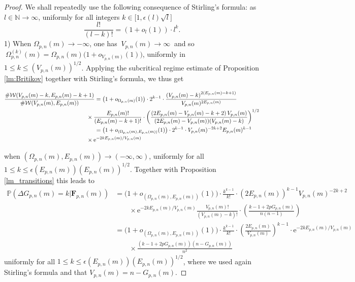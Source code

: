 \documentclass[a4, 11pt]{article}
\numberwithin{equation}{section}
\theoremstyle{plain}
\theoremstyle{definition}
\theoremstyle{remark}
\begin{document}
\begin{proof} We shall repeatedly use the following consequence of Stirling's formula: as $l \in \mathbb N \rightarrow \infty$, uniformly for all integers $k \in \big[ 1,\epsilon(l) \sqrt l \big]$ 
$$
\frac{l!}{(l-k)!}=(1+o_l(1)) \cdot l^k.
$$	
1) When $\Omega_{p,n}(m)\to -\infty$, one has $~V_{p,n}(m)\to \infty~$ and so $~\Omega_{p,n}^{(k)}(m)= \Omega_{p,n}(m)\big(1+o_{V_{p,n}(m)}(1)\big)$, uniformly in $1\leq k\leq \left(V_{p,n}(m)\right)^{1/2}$. Applying the subcritical regime estimate of Proposition \ref{lm:Britikov} together with Stirling's formula, we thus get
\begin{spreadlines}{5pt}
\begin{align*}
	\frac{\#\mathcal{W}(V_{p,n}(m)-k,E_{p,n}(m)-k+1)}{\#\mathcal{W}(V_{p,n}(m),E_{p,n}(m))}&=\big(1+o_{\Omega_{p,n}(m)}(1)\big)\cdot 2^{k-1} \cdot \frac{\left(V_{p,n}(m)-k\right)^{2(E_{p,n}(m)-k+1)}}{V_{p,n}(m)^{2E_{p,n}(m)}}\\
         & \hspace{-0.5cm} \times  \frac{E_{p,n}(m)!}{\left(E_{p,n}(m)-k+1\right)!} \cdot \left(\frac{\left(2E_{p,n}(m)-V_{p,n}(m)-k+2\right)V_{p,n}(m)}{(2E_{p,n}(m)-V_{p,n}(m))(V_{p,n}(m)-k)}\right)^{1/2} \\
	&=\big(1+o_{(\Omega_{p,n}(m),E_{p,n}(m))}(1)\big) \cdot 2^{k-1} \cdot V_{p,n}(m)^{-2k+2} E_{p,n}(m)^{k-1} \\
	& \hspace{-0.5cm} \times \mathrm{e}^{-2kE_{p,n}(m)/V_{p,n}(m)}   
\end{align*}
\end{spreadlines}
when $(\Omega_{p,n}(m),E_{p,n}(m))\to (-\infty,\infty)$, uniformly for all $1\leq k\leq \epsilon(E_{p,n}(m))\left(E_{p,n}(m)\right)^{1/2}$. Together with Proposition \ref{lm_transitions} this leads to 
\begin{align*}
 \mathbb{P}\left( \Delta G_{p,n}(m)=k | \mathbf{F}_{p,n}(m)\right)&=\big(1+o_{(\Omega_{p,n}(m),E_{p,n}(m))}(1)\big) \cdot \frac{k^{k-1}}{k!} \cdot \left(2E_{p,n}(m)\right)^{k-1}V_{p,n}(m)^{-2k+2}\\
 & \qquad \times \mathrm{e}^{-2kE_{p,n}(m)/V_{p,n}(m)}\frac{V_{p,n}(m)!}{\left(V_{p,n}(m)-k\right)!} \cdot \left(\frac{k-1+2pG_{p,n}(m)}{n(n-1)}\right)\\
 &= \big(1+o_{(\Omega_{p,n}(m),E_{p,n}(m))}(1)\big) \cdot \frac{k^{k-1}}{k!}  \cdot  \left(\frac{2E_{p,n}(m)}{V_{p,n}(m)}\right)^{k-1} \cdot \mathrm{e}^{-2kE_{p,n}(m)/V_{p,n}(m)} \\
& \qquad \times \frac{\left(k-1+2pG_{p,n}(m)\right)\left(n-G_{p,n}(m)\right)}{n^2}
\end{align*}
uniformly for all $1\leq k\leq \epsilon(E_{p,n}(m))(E_{p,n}(m))^{1/2}$, where we used again Stirling's formula and that $V_{p,n}(m)=n-G_{p,n}(m)$.


\end{proof}
\end{document}
